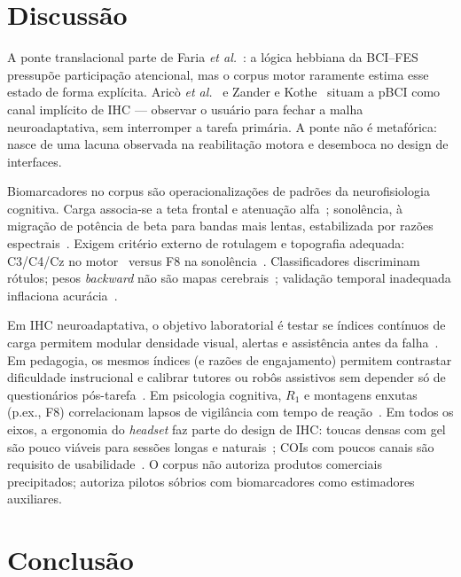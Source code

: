 \documentclass[12pt]{article}
\begin{document}
\section{Discuss\~{a}o}

A ponte translacional parte de Faria \textit{et al.}~\cite{Faria2026}: a l\'{o}gica hebbiana da BCI--FES pressup\~{o}e participa\c{c}\~{a}o atencional, mas o corpus motor raramente estima esse estado de forma expl\'{i}cita. Aric\`{o} \textit{et al.}~\cite{Arico2017} e Zander e Kothe~\cite{Zander2016} situam a pBCI como canal impl\'{i}cito de IHC --- observar o usu\'{a}rio para fechar a malha neuroadaptativa, sem interromper a tarefa prim\'{a}ria. A ponte n\~{a}o \'{e} metaf\'{o}rica: nasce de uma lacuna observada na reabilita\c{c}\~{a}o motora e desemboca no design de interfaces.

Biomarcadores no corpus s\~{a}o operacionaliza\c{c}\~{o}es de padr\~{o}es da neurofisiologia cognitiva. Carga associa-se a teta frontal e atenua\c{c}\~{a}o alfa~\cite{Arico2017}; sonol\^{e}ncia, \`{a} migra\c{c}\~{a}o de pot\^{e}ncia de beta para bandas mais lentas, estabilizada por raz\~{o}es espectrais~\cite{Arif2023}. Exigem crit\'{e}rio externo de rotulagem e topografia adequada: C3/C4/Cz no motor~\cite{Faria2026} versus F8 na sonol\^{e}ncia~\cite{Arif2023}. Classificadores discriminam r\'{o}tulos; pesos \textit{backward} n\~{a}o s\~{a}o mapas cerebrais~\cite{Haufe2014}; valida\c{c}\~{a}o temporal inadequada inflaciona acur\'{a}cia~\cite{Arico2017,Varoquaux2017}.

Em IHC neuroadaptativa, o objetivo laboratorial \'{e} testar se \'{i}ndices cont\'{i}nuos de carga permitem modular densidade visual, alertas e assist\^{e}ncia antes da falha~\cite{Arico2017,Arico2016ATM}. Em pedagogia, os mesmos \'{i}ndices (e raz\~{o}es de engajamento) permitem contrastar dificuldade instrucional e calibrar tutores ou rob\^{o}s assistivos sem depender s\'{o} de question\'{a}rios p\'{o}s-tarefa~\cite{Arico2017,Arif2023}. Em psicologia cognitiva, $R_1$ e montagens enxutas (p.ex., F8) correlacionam lapsos de vigil\^{a}ncia com tempo de rea\c{c}\~{a}o~\cite{Arif2023}. Em todos os eixos, a ergonomia do \textit{headset} faz parte do design de IHC: toucas densas com gel s\~{a}o pouco vi\'{a}veis para sess\~{o}es longas e naturais~\cite{Arico2017}; COIs com poucos canais s\~{a}o requisito de usabilidade~\cite{Arif2023}. O corpus n\~{a}o autoriza produtos comerciais precipitados; autoriza pilotos s\'{o}brios com biomarcadores como estimadores auxiliares.

\section{Conclus\~{a}o}
\end{document}
